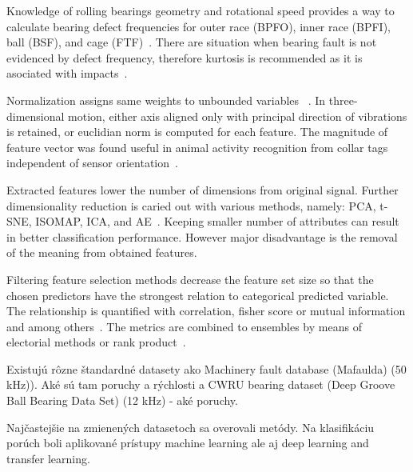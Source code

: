 \documentclass{llncs}
\begin{document}
Knowledge of rolling bearings geometry and rotational speed provides a way to calculate bearing defect frequencies for outer race (BPFO), inner race (BPFI), ball (BSF), and cage (FTF)~\cite{mohanty_machinery_2015, ziaran_technicka_2013}. There are situation when bearing fault is not evidenced by defect frequency, therefore kurtosis is recommended as it is asociated with impacts~\cite{brito_fault_2021}.

Normalization assigns same weights to unbounded variables ~\cite{zheng_feature_2018}. In three-dimensional motion, either axis aligned only with principal direction of vibrations is retained, or euclidian norm is computed for each feature. The magnitude of feature vector was found useful in animal activity recognition from collar tags independent of sensor orientation~\cite{kamminga_robust_2018}. 

Extracted features lower the number of dimensions from original signal. Further dimensionality reduction is caried out with various methods, namely: PCA, t-SNE, ISOMAP, ICA, and AE~\cite{brito_fault_2021}. Keeping smaller number of attributes can result in better classification performance. However major disadvantage is the removal of the meaning from obtained features. 

Filtering feature selection methods decrease the feature set size so that the chosen predictors have the strongest relation to categorical predicted variable.
The relationship is quantified with correlation, fisher score or mutual information and among others~\cite{nandi_condition_2019}. The metrics are combined to ensembles by means of electorial methods or rank product~\cite{breitling_rank_2004}.



Existujú rôzne štandardné datasety ako Machinery fault database (Mafaulda) (50 kHz)). Aké sú tam poruchy a rýchlosti a CWRU bearing dataset (Deep Groove Ball Bearing Data Set) (12 kHz) - aké poruchy.
\cite{ribeiro_rotating_2017}



Najčastejšie na zmienených datasetoch sa overovali metódy. Na klasifikáciu porúch boli aplikované prístupy machine learning ale aj deep learning and transfer learning.

\end{document}
